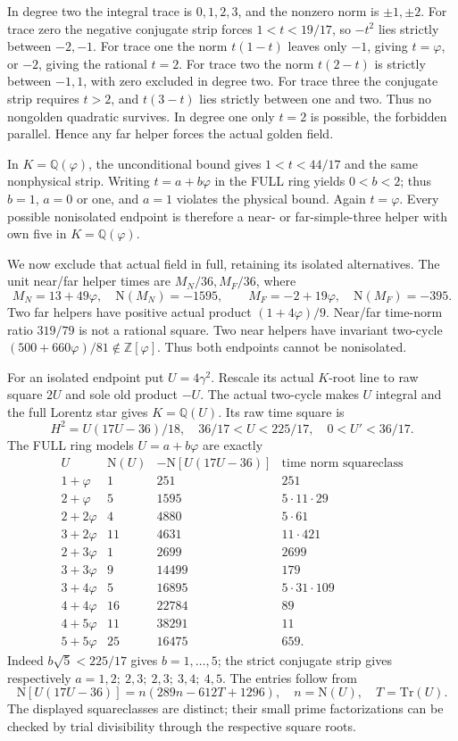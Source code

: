 \documentclass[11pt]{article}
\begin{document}
In degree two the integral trace is \(0,1,2,3\), and the nonzero
norm is \(\pm1,\pm2\).
For trace zero the negative conjugate strip forces
\(1<t<19/17\), so \(-t^2\) lies strictly between \(-2,-1\).
For trace one the norm \(t(1-t)\) leaves only \(-1\), giving
\(t=\varphi\), or \(-2\), giving the rational \(t=2\).
For trace two the norm \(t(2-t)\) is strictly between \(-1,1\),
with zero excluded in degree two.
For trace three the conjugate strip requires \(t>2\), and
\(t(3-t)\) lies strictly between one and two.
Thus no nongolden quadratic survives.
In degree one only \(t=2\) is possible, the forbidden parallel.
Hence any far helper forces the actual golden field.

In \(K=\mathbb Q(\varphi)\), the unconditional bound gives
\(1<t<44/17\) and the same nonphysical strip.
Writing \(t=a+b\varphi\) in the FULL ring yields \(0<b<2\);
thus \(b=1\), \(a=0\) or one, and \(a=1\) violates the
physical bound.  Again \(t=\varphi\).
Every possible nonisolated endpoint is therefore a near- or
far-simple-three helper with own five in \(K=\mathbb Q(\varphi)\).

We now exclude that actual field in full, retaining its isolated
alternatives.  The unit near/far helper times are \(M_N/36,M_F/36\),
where
\[
 M_N=13+49\varphi,\quad \mathrm N(M_N)=-1595,\qquad
 M_F=-2+19\varphi,\quad \mathrm N(M_F)=-395 .
\]
Two far helpers have positive actual product \((1+4\varphi)/9\).
Near/far time-norm ratio \(319/79\) is not a rational square.
Two near helpers have invariant two-cycle
\((500+660\varphi)/81\notin\mathbb Z[\varphi]\).
Thus both endpoints cannot be nonisolated.

For an isolated endpoint put \(U=4\gamma^2\).
Rescale its actual \(K\)-root line to raw square \(2U\) and
sole old product \(-U\).
The actual two-cycle makes \(U\) integral and the full Lorentz
star gives \(K=\mathbb Q(U)\).
Its raw time square is
\[
 H^2=U(17U-36)/18,\quad
 36/17<U<225/17,\quad0<U'<36/17 .
\]
The FULL ring models \(U=a+b\varphi\) are exactly
\[
\begin{array}{c|r|r|r}
U&\mathrm N(U)&-\mathrm N[U(17U-36)]&
 \text{time norm squareclass}\\ \hline
1+\varphi&1&251&251\\
2+\varphi&5&1595&5\cdot11\cdot29\\
2+2\varphi&4&4880&5\cdot61\\
3+2\varphi&11&4631&11\cdot421\\
2+3\varphi&1&2699&2699\\
3+3\varphi&9&14499&179\\
3+4\varphi&5&16895&5\cdot31\cdot109\\
4+4\varphi&16&22784&89\\
4+5\varphi&11&38291&11\\
5+5\varphi&25&16475&659 .
\end{array}
\]
Indeed \(b\sqrt5<225/17\) gives \(b=1,\ldots,5\);
the strict conjugate strip gives respectively
\(a=1,2;\ 2,3;\ 2,3;\ 3,4;\ 4,5\).
The entries follow from
\[
 \mathrm N[U(17U-36)]
 =n(289n-612T+1296),\quad n=\mathrm N(U),\quad T=\mathrm{Tr}(U).
\]
The displayed squareclasses are distinct; their small prime
factorizations can be checked by trial divisibility through the
respective square roots.
\end{document}
